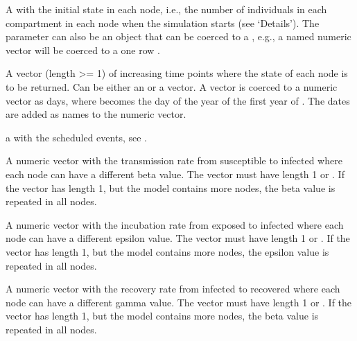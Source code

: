 \documentclass[letterpaper]{book}
\begin{document}
%
\begin{Arguments}
\begin{ldescription}
\item[\code{u0}] A  with the initial state in each node,
i.e., the number of individuals in each compartment in each
node when the simulation starts (see `Details'). The
parameter  can also be an object that can be coerced
to a , e.g., a named numeric vector will be
coerced to a one row .

\item[\code{tspan}] A vector (length >= 1) of increasing time points
where the state of each node is to be returned. Can be either
an  or a  vector. A 
vector is coerced to a numeric vector as days, where
 becomes the day of the year of the first year
of . The dates are added as names to the numeric
vector.

\item[\code{events}] a  with the scheduled events, see
.

\item[\code{beta}] A numeric vector with the transmission rate from
susceptible to infected where each node can have a different
beta value. The vector must have length 1 or .
If the vector has length 1, but the model contains more nodes,
the beta value is repeated in all nodes.

\item[\code{epsilon}] A numeric vector with the incubation rate from
exposed to infected where each node can have a different
epsilon value. The vector must have length 1 or
.  If the vector has length 1, but the model
contains more nodes, the epsilon value is repeated in all
nodes.

\item[\code{gamma}] A numeric vector with the recovery rate from infected
to recovered where each node can have a different gamma
value. The vector must have length 1 or . If
the vector has length 1, but the model contains more nodes,
the beta value is repeated in all nodes.
\end{ldescription}
\end{Arguments}
%
\end{document}
